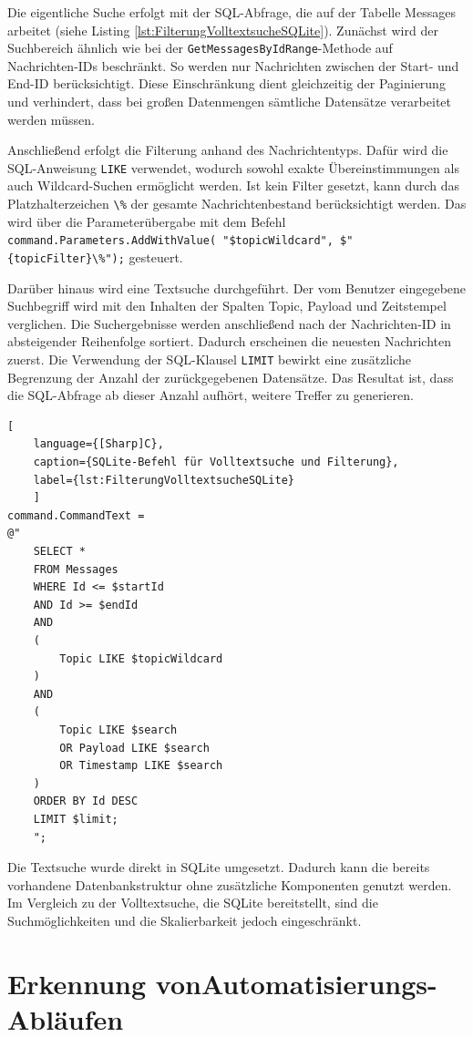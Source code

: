 Die eigentliche Suche erfolgt mit der SQL-Abfrage, die auf der Tabelle Messages arbeitet (siehe Listing \ref{lst:FilterungVolltextsucheSQLite}). Zunächst wird der Suchbereich ähnlich wie bei der \lstinline|GetMessagesByIdRange|-Methode auf Nachrichten-IDs beschränkt. So werden nur Nachrichten zwischen der Start- und End-ID berücksichtigt.
Diese Einschränkung dient gleichzeitig der Paginierung und verhindert, dass bei großen Datenmengen sämtliche Datensätze verarbeitet werden müssen.

Anschließend erfolgt die Filterung anhand des Nachrichtentyps. Dafür wird die SQL-Anweisung \lstinline|LIKE| verwendet, wodurch sowohl exakte Übereinstimmungen als auch Wildcard-Suchen ermöglicht werden. Ist kein Filter gesetzt, kann durch das Platzhalterzeichen \lstinline|\%| der gesamte Nachrichtenbestand berücksichtigt werden. 
Das wird über die Parameterübergabe mit dem Befehl \lstinline|command.Parameters.AddWithValue( "$topicWildcard", $"{topicFilter}\%");| gesteuert.

Darüber hinaus wird eine Textsuche durchgeführt. Der vom Benutzer eingegebene Suchbegriff wird mit den Inhalten der Spalten Topic, Payload und Zeitstempel verglichen. Die Suchergebnisse werden anschließend nach der Nachrichten-ID in absteigender Reihenfolge sortiert. Dadurch erscheinen die neuesten Nachrichten zuerst. 
Die Verwendung der SQL-Klausel \lstinline|LIMIT| bewirkt eine zusätzliche Begrenzung der Anzahl der zurückgegebenen Datensätze. Das Resultat ist, dass die SQL-Abfrage ab dieser Anzahl aufhört, weitere Treffer zu generieren.

\begin{lstlisting}[
    language={[Sharp]C},
    caption={SQLite-Befehl für Volltextsuche und Filterung},
    label={lst:FilterungVolltextsucheSQLite}
    ]
command.CommandText =
@"
    SELECT *
    FROM Messages
    WHERE Id <= $startId
    AND Id >= $endId
    AND
    (
        Topic LIKE $topicWildcard
    )
    AND
    (
        Topic LIKE $search
        OR Payload LIKE $search
        OR Timestamp LIKE $search
    )
    ORDER BY Id DESC
    LIMIT $limit;
    ";
\end{lstlisting}

Die Textsuche wurde direkt in SQLite umgesetzt. Dadurch kann die bereits vorhandene Datenbankstruktur ohne zusätzliche Komponenten genutzt werden. Im Vergleich zu der Volltextsuche, die SQLite bereitstellt, sind die Suchmöglichkeiten und die Skalierbarkeit jedoch eingeschränkt. 
\section{Erkennung vonAutomatisierungs-Abläufen}
